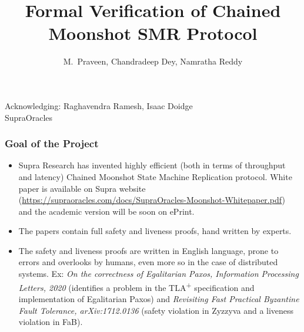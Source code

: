 \documentclass{beamer}
\title{Formal Verification of Chained Moonshot SMR Protocol}
\author{ M.~Praveen, Chandradeep Dey, Namratha Reddy}
\institute{Chennai Mathematical Institute}
\date{}
\begin{document}
\begin{frame}
    \titlepage

    \begin{center}
    Acknowledging: Raghavendra Ramesh, Isaac Doidge\\

    \footnotesize{SupraOracles}
    \end{center}
\end{frame}

\begin{frame}
    \frametitle{Goal of the Project}
    \begin{itemize}
        \item Supra Research has invented highly efficient (both in
            terms of throughput and latency) Chained Moonshot State
            Machine Replication protocol. White paper is available on
            Supra website
            (\href{https://supraoracles.com/docs/SupraOracles-Moonshot-Whitepaper.pdf}{https://supraoracles.com/docs/SupraOracles-Moonshot-Whitepaper.pdf}) and the academic version will be soon on
            ePrint.
            \pause
            \vfill
        \item The papers contain full safety and liveness proofs, hand
            written by experts.
            \pause
            \vfill
        \item The safety and liveness proofs are written in English
            language, prone to errors and overlooks by humans, even
            more so in the case of distributed systems. Ex:
            \emph{On the correctness of Egalitarian Paxos, Information
            Processing Letters, 2020} (identifies a problem in the
            TLA\textsuperscript{+} specification and implementation of
        Egalitarian Paxos) \pause and \emph{Revisiting Fast Practical
        Byzantine Fault Tolerance, arXiv:1712.0136} (safety violation
        in Zyzzyva and a liveness violation in FaB).
    \end{itemize}
\end{frame}
\end{document}
